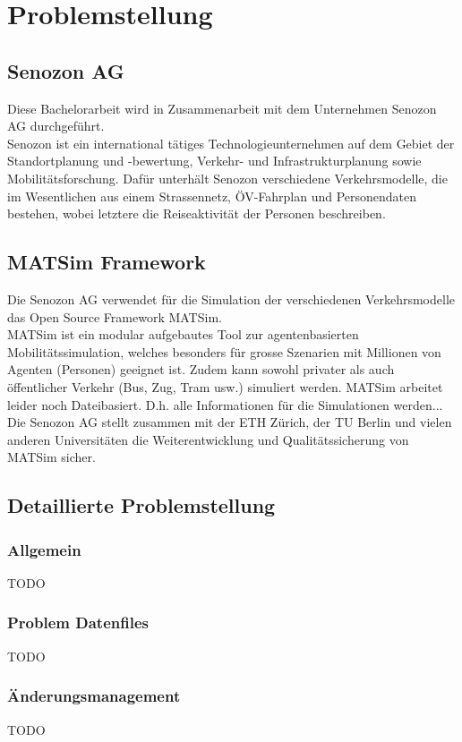 \chapter{Problemstellung}

\section{Senozon AG}
Diese Bachelorarbeit wird in Zusammenarbeit mit dem Unternehmen Senozon AG durchgeführt.\\
Senozon ist ein international tätiges Technologieunternehmen auf dem Gebiet der Standortplanung und -bewertung, Verkehr- und Infrastrukturplanung sowie Mobilitätsforschung. Dafür unterhält Senozon verschiedene Verkehrsmodelle, die im Wesentlichen aus einem Strassennetz, ÖV-Fahrplan und Personendaten bestehen, wobei letztere die Reiseaktivität der Personen beschreiben.
\section{MATSim Framework}
Die Senozon AG verwendet für die Simulation der verschiedenen Verkehrsmodelle das Open Source Framework MATSim.\\
MATSim ist ein modular aufgebautes Tool zur agentenbasierten Mobilitätssimulation, welches besonders für grosse Szenarien mit Millionen von Agenten (Personen) geeignet ist. Zudem kann sowohl privater als auch öffentlicher Verkehr (Bus, Zug, Tram usw.) simuliert werden. MATSim arbeitet leider noch Dateibasiert. D.h. alle Informationen für die Simulationen werden...
Die Senozon AG stellt zusammen mit der ETH Zürich, der TU Berlin und vielen anderen Universitäten die Weiterentwicklung und Qualitätssicherung von MATSim sicher.\\
\section{Detaillierte Problemstellung}
\subsection{Allgemein}
TODO
\subsection{Problem Datenfiles}
TODO
\subsection{Änderungsmanagement}
TODO


